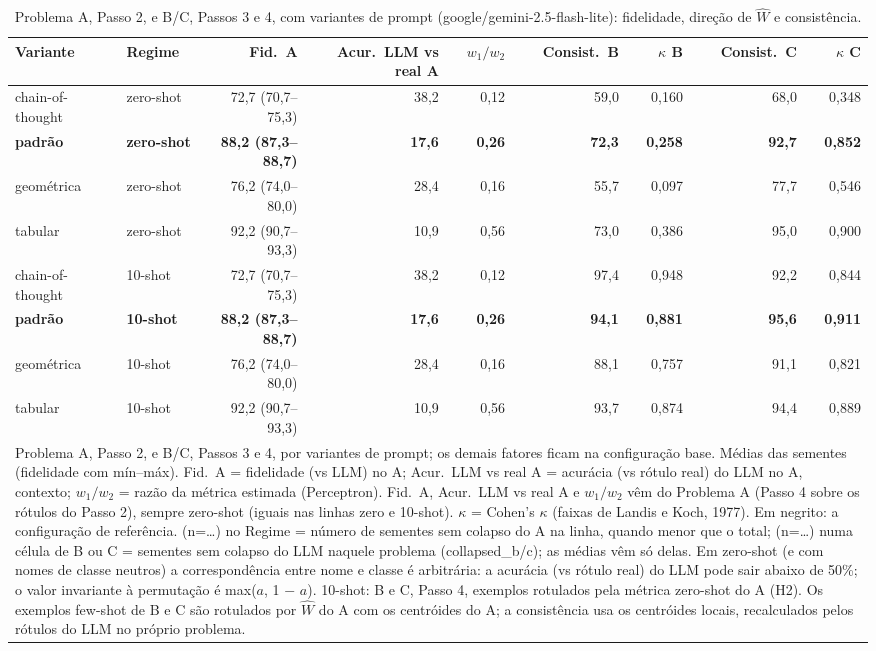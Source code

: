 \begin{table}[htbp]
\centering
\small
\caption{Problema A, Passo 2, e B/C, Passos 3 e 4, com variantes de prompt (google/gemini-2.5-flash-lite): fidelidade, direção de $\hat{W}$ e consistência.}
\label{tab:bloco1_vies_variantes_prompt_flashlite}
\begin{tabular}{llrrrrrrr}
\toprule
Variante & Regime & Fid.\ A & Acur.\ LLM vs real A & $w_1/w_2$ & Consist.\ B & $\kappa$ B & Consist.\ C & $\kappa$ C \\
\midrule
chain-of-thought & zero-shot & 72,7 (70,7–75,3) & 38,2 & 0,12 & 59,0 & 0,160 & 68,0 & 0,348 \\
\textbf{padrão} & \textbf{zero-shot} & \textbf{88,2 (87,3–88,7)} & \textbf{17,6} & \textbf{0,26} & \textbf{72,3} & \textbf{0,258} & \textbf{92,7} & \textbf{0,852} \\
geométrica & zero-shot & 76,2 (74,0–80,0) & 28,4 & 0,16 & 55,7 & 0,097 & 77,7 & 0,546 \\
tabular & zero-shot & 92,2 (90,7–93,3) & 10,9 & 0,56 & 73,0 & 0,386 & 95,0 & 0,900 \\
\midrule
chain-of-thought & 10-shot & 72,7 (70,7–75,3) & 38,2 & 0,12 & 97,4 & 0,948 & 92,2 & 0,844 \\
\textbf{padrão} & \textbf{10-shot} & \textbf{88,2 (87,3–88,7)} & \textbf{17,6} & \textbf{0,26} & \textbf{94,1} & \textbf{0,881} & \textbf{95,6} & \textbf{0,911} \\
geométrica & 10-shot & 76,2 (74,0–80,0) & 28,4 & 0,16 & 88,1 & 0,757 & 91,1 & 0,821 \\
tabular & 10-shot & 92,2 (90,7–93,3) & 10,9 & 0,56 & 93,7 & 0,874 & 94,4 & 0,889 \\
\bottomrule
\multicolumn{9}{p{0.95\linewidth}}{\footnotesize Problema A, Passo 2, e B/C, Passos 3 e 4, por variantes de prompt; os demais fatores ficam na configuração base. Médias das sementes (fidelidade com mín–máx). Fid.\ A = fidelidade (vs LLM) no A; Acur.\ LLM vs real A = acurácia (vs rótulo real) do LLM no A, contexto; $w_1/w_2$ = razão da métrica estimada (Perceptron). Fid.\ A, Acur.\ LLM vs real A e $w_1/w_2$ vêm do Problema A (Passo 4 sobre os rótulos do Passo 2), sempre zero-shot (iguais nas linhas zero e 10-shot). $\kappa$ = Cohen's $\kappa$ (faixas de Landis e Koch, 1977). Em negrito: a configuração de referência. (n=…) no Regime = número de sementes sem colapso do A na linha, quando menor que o total; (n=…) numa célula de B ou C = sementes sem colapso do LLM naquele problema (collapsed\_b/c); as médias vêm só delas. Em zero-shot (e com nomes de classe neutros) a correspondência entre nome e classe é arbitrária: a acurácia (vs rótulo real) do LLM pode sair abaixo de 50\%; o valor invariante à permutação é max($a$, 1 $-$ $a$). 10-shot: B e C, Passo 4, exemplos rotulados pela métrica zero-shot do A (H2). Os exemplos few-shot de B e C são rotulados por $\hat{W}$ do A com os centróides do A; a consistência usa os centróides locais, recalculados pelos rótulos do LLM no próprio problema.} \\
\end{tabular}
\end{table}
